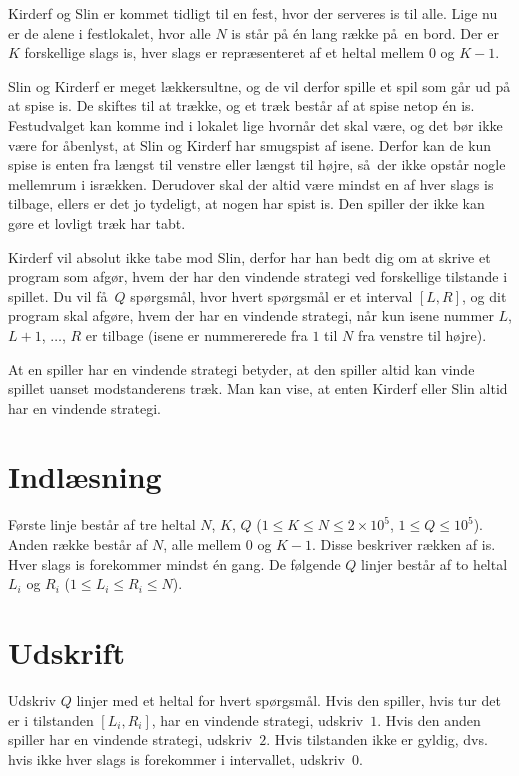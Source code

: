 
Kirderf og Slin er kommet tidligt til en fest, hvor der serveres is til alle.
Lige nu er de alene i festlokalet, hvor alle $N$ is står på én lang række på en bord.
Der er $K$ forskellige slags is, hver slags er repræsenteret af et heltal mellem $0$ og $K-1$.


Slin og Kirderf er meget lækkersultne, og de vil derfor spille et spil som går ud på at spise is.
De skiftes til at trække, og et træk består af at spise netop én is.
Festudvalget kan komme ind i lokalet lige hvornår det skal være, og det bør ikke være for åbenlyst, at Slin og Kirderf har smugspist af isene.
Derfor kan de kun spise is enten fra længst til venstre eller længst til højre, så der ikke opstår nogle mellemrum i isrækken.
Derudover skal der altid være mindst en af hver slags is tilbage, ellers er det jo tydeligt, at nogen har spist is.
Den spiller der ikke kan gøre et lovligt træk har tabt.

Kirderf vil absolut ikke tabe mod Slin, derfor har han bedt dig om at skrive et program som afgør, hvem der har den vindende strategi ved forskellige tilstande i spillet.
Du vil få $Q$ spørgsmål, hvor hvert spørgsmål er et interval $[L,R]$, og dit program skal afgøre, hvem der har en vindende strategi, når kun isene nummer $L$, $L+1$, $\dots$, $R$ er tilbage (isene er nummererede fra $1$ til $N$ fra venstre til højre).

At en spiller har en vindende strategi betyder, at den spiller altid kan vinde spillet uanset modstanderens træk.
Man kan vise, at enten Kirderf eller Slin altid har en vindende strategi.

\section*{Indlæsning}

Første linje består af tre heltal $N$, $K$, $Q$ ($1 \le K \le N \le 2 \times 10^5$, $1 \le Q \le 10^5$).
Anden række består af $N$, alle mellem $0$ og $K-1$.
Disse beskriver rækken af is.
Hver slags is forekommer mindst én gang.
De følgende $Q$ linjer består af to heltal $L_i$ og $R_i$ ($1 \le L_i \le R_i \le N$).

\section*{Udskrift}

Udskriv $Q$ linjer med et heltal for hvert spørgsmål.
Hvis den spiller, hvis tur det er i tilstanden $[L_i, R_i]$, har en vindende strategi, udskriv~$1$.
Hvis den anden spiller har en vindende strategi, udskriv~$2$.
Hvis tilstanden ikke er gyldig, dvs. hvis ikke hver slags is forekommer i intervallet, udskriv~$0$.

